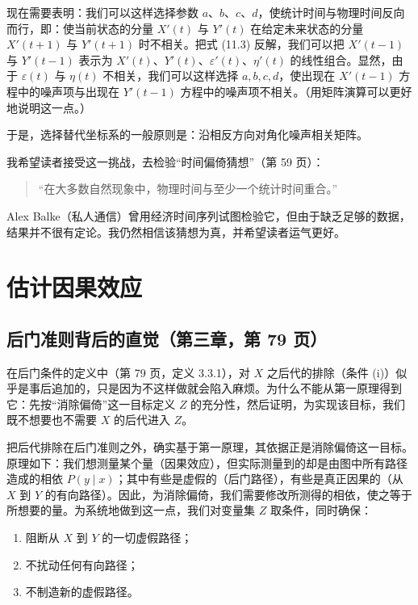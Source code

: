 现在需要表明：我们可以这样选择参数 $a$、$b$、$c$、$d$，使统计时间与物理时间反向而行，即：使当前状态的分量 $X'(t)$ 与 $Y'(t)$ 在给定未来状态的分量 $X'(t+1)$ 与 $Y'(t+1)$ 时不相关。把式 (11.3) 反解，我们可以把 $X'(t-1)$ 与 $Y'(t-1)$ 表示为 $X'(t)$、$Y'(t)$、$\varepsilon'(t)$、$\eta'(t)$ 的线性组合。显然，由于 $\varepsilon(t)$ 与 $\eta(t)$ 不相关，我们可以这样选择 $a,b,c,d$，使出现在 $X'(t-1)$ 方程中的噪声项与出现在 $Y'(t-1)$ 方程中的噪声项不相关。（用矩阵演算可以更好地说明这一点。）

于是，选择替代坐标系的一般原则是：沿相反方向对角化噪声相关矩阵。

我希望读者接受这一挑战，去检验“时间偏倚猜想”（第 59 页）：

\begin{quote}
“在大多数自然现象中，物理时间与至少一个统计时间重合。”
\end{quote}

Alex Balke（私人通信）曾用经济时间序列试图检验它，但由于缺乏足够的数据，结果并不很有定论。我仍然相信该猜想为真，并希望读者运气更好。

\section{估计因果效应}

\subsection{后门准则背后的直觉（第三章，第 79 页）}


在后门条件的定义中（第 79 页，定义 3.3.1），对 $X$ 之后代的排除（条件 (i)）似乎是事后追加的，只是因为不这样做就会陷入麻烦。为什么不能从第一原理得到它：先按“消除偏倚”这一目标定义 $Z$ 的充分性，然后证明，为实现该目标，我们既不想要也不需要 $X$ 的后代进入 $Z$。


把后代排除在后门准则之外，确实基于第一原理，其依据正是消除偏倚这一目标。原理如下：我们想测量某个量（因果效应），但实际测量到的却是由图中所有路径造成的相依 $P(y\mid x)$；其中有些是虚假的（后门路径），有些是真正因果的（从 $X$ 到 $Y$ 的有向路径）。因此，为消除偏倚，我们需要修改所测得的相依，使之等于所想要的量。为系统地做到这一点，我们对变量集 $Z$ 取条件，同时确保：

\begin{enumerate}[label=\arabic*.]
\item 阻断从 $X$ 到 $Y$ 的一切虚假路径；
\item 不扰动任何有向路径；
\item 不制造新的虚假路径。
\end{enumerate}


